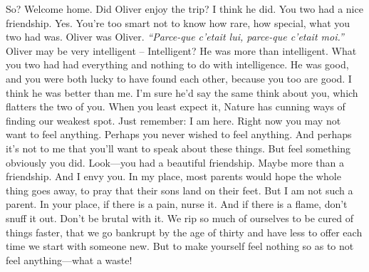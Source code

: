 \documentclass[../butidigress.tex]{subfiles}
\begin{document}
\begin{drama} %
\perlmanspeaks So? Welcome home. Did Oliver enjoy the trip?
\eliospeaks I think he did.
\perlmanspeaks You two had a nice friendship.
\eliospeaks{} Yes.
\perlmanspeaks You're too smart not to know how rare, how special, what you two had was.
\eliospeaks Oliver was Oliver.
\perlmanspeaks \emph{``Parce-que c'etait lui, parce-que c'etait moi.''} 
\eliospeaks{} Oliver may be very intelligent --
\perlmanspeaks{} Intelligent? He was more than intelligent. What you two had had everything and nothing to do with intelligence. He was good, and you were both lucky to have found each other, because you too are good.
\eliospeaks I think he was better than me.
\perlmanspeaks I'm sure he'd say the same think about you, which flatters the two of you.
\perlmanspeaks{} When you least expect it, Nature has cunning ways of finding our weakest spot. Just remember: I am here. Right now you may not want to feel anything. Perhaps you never wished to feel anything. And perhaps it's not to me that you'll want to speak about these things. But feel something obviously you did.
\perlmanspeaks{} Look---you had a beautiful friendship. Maybe more than a friendship. And I envy you. In my place, most parents would hope the whole thing goes away, to pray that their sons land on their feet. But I am not such a parent. In your place, if there is a pain, nurse it. And if there is a flame, don't snuff it out. Don't be brutal with it. We rip so much of ourselves to be cured of things faster, that we go bankrupt by the age of thirty and have less to offer each time we start with someone new. But to make yourself feel nothing so as to not feel anything---what a waste!

\end{drama}
\end{document}
